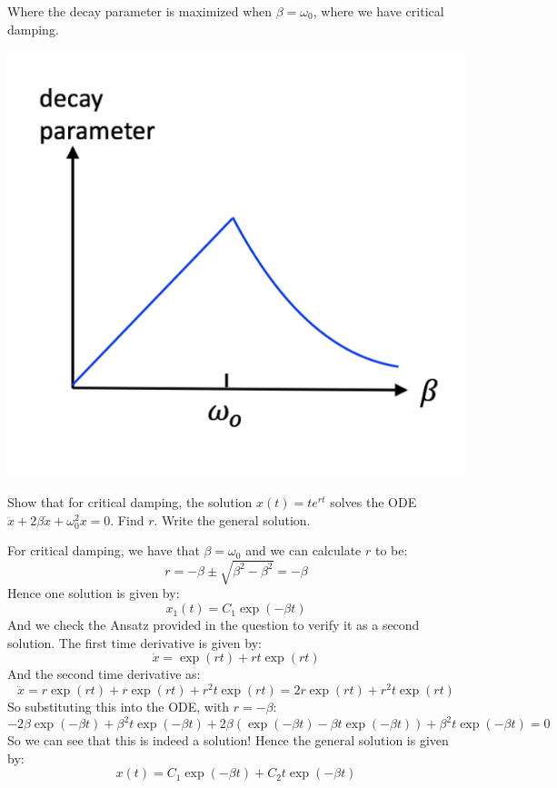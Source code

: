 \documentclass[../PHYS306Notes.tex]{subfiles}
\begin{document}
\begin{s}
Where the decay parameter is maximized when $\beta = \omega_0$, where we have critical damping.
\begin{center}
    \includegraphics[scale=0.5]{Lecture-9/w9-img1.png}
\end{center}
\end{s}

\begin{p}
Show that for critical damping, the solution $x(t) = te^{rt}$ solves the ODE $\ddot{x} + 2\beta\dot{x} + \omega_0^2x = 0$. Find $r$. Write the general solution.
\end{p}
\begin{s}
For critical damping, we have that $\beta = \omega_0$ and we can calculate $r$ to be:
\[r = -\beta \pm \sqrt{\beta^2 - \beta^2} = -\beta\]
Hence one solution is given by:
\[x_1(t) = C_1\exp(-\beta t)\]
And we check the Ansatz provided in the question to verify it as a second solution. The first time derivative is given by:
\[\dot{x} = \exp(rt) + rt\exp(rt)\]
And the second time derivative as:
\[\ddot{x} = r\exp(rt) + r\exp(rt) + r^2t\exp(rt) = 2r\exp(rt) + r^2t\exp(rt)\]
So substituting this into the ODE, with $r = -\beta$:
\[-2\beta\exp(-\beta t) + \beta^2t\exp(-\beta t) + 2\beta\left(\exp(-\beta t) - \beta t\exp(-\beta t)\right) + \beta^2t\exp(-\beta t) = 0\]
So we can see that this is indeed a solution! Hence the general solution is given by:
\[x(t) = C_1\exp(-\beta t) + C_2 t\exp(-\beta t)\]
\end{s}
\end{document}

